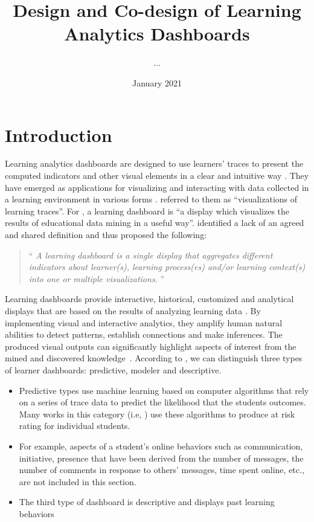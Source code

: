 \documentclass[preprint,12pt]{elsarticle}
\title{Design and Co-design of Learning Analytics Dashboards}
\author{...}
\date{January 2021}
\begin{document}
\maketitle

\section{Introduction} 
Learning analytics dashboards are designed to use learners' traces to present the computed indicators and other visual elements in a clear and intuitive way \citep{Brouns2015}.
They have emerged as applications for visualizing and interacting with data collected in a learning environment in various forms \citep{Ramos2015}. \citet{Steiner2014} referred to them as ``visualizations of learning traces''. For \citet{Yoo2015}, a learning dashboard is ``a display which visualizes the results of educational data mining in a useful way''. 
\citet{Schwendimann2017} identified a lack of an agreed and shared definition and thus proposed the following:
\begin{quotation}
	``\textit{%
		A learning dashboard is a single display that aggregates different indicators
		about learner(s), learning process(es) and/or learning context(s) into one or
		multiple visualizations.
	}'' \citep{Schwendimann2017}
\end{quotation}
Learning dashboards provide interactive, historical, customized and analytical displays that are based on the results of  analyzing learning data \citep{Park2015, Kim2015}. By implementing visual and interactive analytics, they amplify human natural abilities to detect patterns, establish connections and make inferences. The produced visual outputs can significantly highlight aspects of interest from the mined and discovered knowledge~\citep{Duval2011}. According to \citet{bennett2019four}, we can distinguish  three types of learner dashboards: predictive, modeler and descriptive. 
\begin{itemize}
    \item Predictive types use machine learning based on computer algorithms that rely on a series of trace data to predict the likelihood that the students outcomes. Many works in this category (i.e, \citep{arnold2014exercise}) use these algorithms to produce at risk rating for individual students.
    \item For example, aspects of a student's online behaviors such as communication, initiative, presence that have been derived from the number of messages, the number of comments in response to others' messages, time spent online, etc., are not included in this section. 
    \item The third type of dashboard is descriptive and displays past learning behaviors
\end{itemize}
\end{document}
